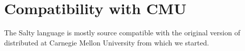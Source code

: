 \chapter{Compatibility with CMU }
%
The Salty language is mostly source compatible with the original
version of  distributed at Carnegie Mellon University from which
we started.
%

